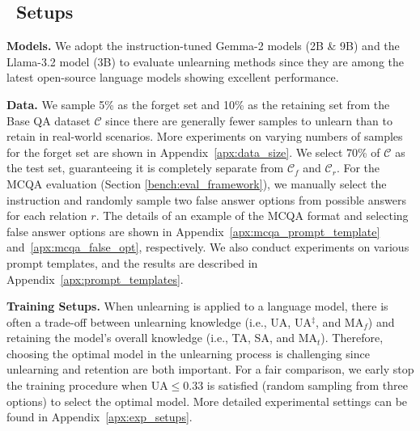 \subsection{\ourdata~Setups}
\noindent\textbf{Models.} We adopt the instruction-tuned Gemma-2 \citep{team2024gemma} models (2B \& 9B) and the Llama-3.2 \citep{dubey2024llama} model (3B) to evaluate unlearning methods since they are among the latest open-source language models showing excellent performance.




\noindent\textbf{Data.} We sample 5\% as the forget set and 10\% as the retaining set from the Base QA dataset $\mathcal{C}$ since there are generally fewer samples to unlearn than to retain in real-world scenarios.
More experiments on varying numbers of samples for the forget set are shown in Appendix~\ref{apx:data_size}.
We select 70\% of $\mathcal{C}$ as the test set, guaranteeing it is completely separate from $\mathcal{C}_{f}$ and $\mathcal{C}_{r}$.
For the MCQA evaluation (Section \ref{bench:eval_framework}), we manually select the instruction and randomly sample two false answer options from possible answers for each relation $r$.
The details of an example of the MCQA format and selecting false answer options are shown in Appendix~\ref{apx:mcqa_prompt_template} and~\ref{apx:mcqa_false_opt}, respectively.
We also conduct experiments on various prompt templates, and the results are described in Appendix~\ref{apx:prompt_templates}.

\noindent\textbf{Training Setups.} When unlearning is applied to a language model, there is often a trade-off between unlearning knowledge (i.e., UA, UA$^{\ddag}$, and MA$_{f}$) and retaining the model's overall knowledge (i.e., TA, SA, and MA$_{t}$).
Therefore, choosing the optimal model in the unlearning process is challenging since unlearning and retention are both important.
For a fair comparison, we early stop the training procedure when UA$\leq 0.33$ is satisfied (random sampling from three options) to select the optimal model.
More detailed experimental settings can be found in Appendix~\ref{apx:exp_setups}.










